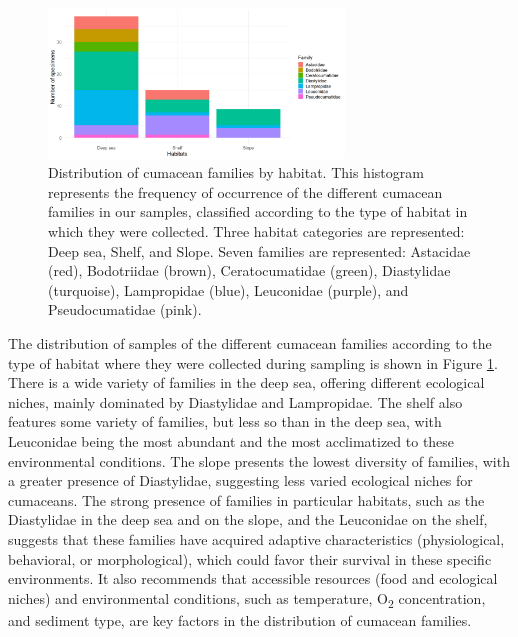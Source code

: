\begin{figure}[]
    \centering
    \includegraphics[width=0.7\textwidth]{figure4.png}
    \caption{Distribution of cumacean families by habitat. This histogram represents the frequency of occurrence of the different cumacean families in our samples, classified according to the type of habitat in which they were collected. Three habitat categories are represented: Deep sea, Shelf, and Slope. Seven families are represented: Astacidae (red), Bodotriidae (brown), Ceratocumatidae (green), Diastylidae (turquoise), Lampropidae (blue), Leuconidae (purple), and Pseudocumatidae (pink). \label{fig:fig5}}
\end{figure}

The distribution of samples of the different cumacean families according to the type of habitat where they were collected during sampling is shown in Figure \ref{fig:fig5}. There is a wide variety of families in the deep sea, offering different ecological niches, mainly dominated by Diastylidae and Lampropidae. The shelf also features some variety of families, but less so than in the deep sea, with Leuconidae being the most abundant and the most acclimatized to these environmental conditions. The slope presents the lowest diversity of families, with a greater presence of Diastylidae, suggesting less varied ecological niches for cumaceans. The strong presence of families in particular habitats, such as the Diastylidae in the deep sea and on the slope, and the Leuconidae on the shelf, suggests that these families have acquired adaptive characteristics (physiological, behavioral, or morphological), which could favor their survival in these specific environments. It also recommends that accessible resources (food and ecological niches) and environmental conditions, such as temperature, O\textsubscript{2} concentration, and sediment type, are key factors in the distribution of cumacean families.

